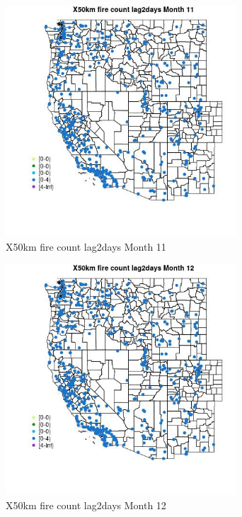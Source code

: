 \begin{figure} 
\centering  
\includegraphics[width=0.77\textwidth]{Code_Outputs/Report_ML_input_PM25_Step4_part_e_de_duplicated_aves_compiled_2019-05-14wNAs_MapObsMo11X50km_fire_count_lag2days.jpg} 
\caption{\label{fig:Report_ML_input_PM25_Step4_part_e_de_duplicated_aves_compiled_2019-05-14wNAsMapObsMo11X50km_fire_count_lag2days}X50km fire count lag2days Month 11} 
\end{figure} 
 

\begin{figure} 
\centering  
\includegraphics[width=0.77\textwidth]{Code_Outputs/Report_ML_input_PM25_Step4_part_e_de_duplicated_aves_compiled_2019-05-14wNAs_MapObsMo12X50km_fire_count_lag2days.jpg} 
\caption{\label{fig:Report_ML_input_PM25_Step4_part_e_de_duplicated_aves_compiled_2019-05-14wNAsMapObsMo12X50km_fire_count_lag2days}X50km fire count lag2days Month 12} 
\end{figure} 
 

